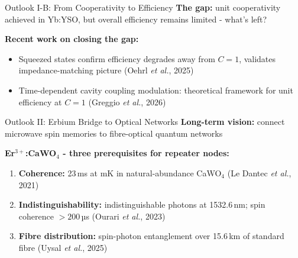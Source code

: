 \documentclass[10pt]{beamer}
\begin{document}
\begin{frame}{Outlook I-B: From Cooperativity to Efficiency}
    \textbf{The gap:} unit cooperativity achieved in Yb:YSO, but overall efficiency remains limited - what's left?

    \vspace{0.2cm}
    \textbf{Recent work on closing the gap:}
    \begin{itemize}
        \item<2-> Squeezed states confirm efficiency degrades away from $C=1$, validates impedance-matching picture (Oehrl \textit{et al.}, 2025)
        \item<3-> Time-dependent cavity coupling modulation: theoretical framework for unit efficiency at $C=1$ (Greggio \textit{et al.}, 2026)
    \end{itemize}

    \vspace{0.2cm}
\end{frame}

\begin{frame}{Outlook II: Erbium Bridge to Optical Networks}
    \textbf{Long-term vision:} connect microwave spin memories to fibre-optical quantum networks

    \vspace{0.15cm}
    \textbf{Er$^{3+}$:CaWO$_4$ - three prerequisites for repeater nodes:}
    \begin{enumerate}
        \item<2-> \textbf{Coherence:} 23\,ms at mK in natural-abundance CaWO$_4$ (Le Dantec \textit{et al.}, 2021)
        \item<3-> \textbf{Indistinguishability:} indistinguishable photons at 1532.6\,nm; spin coherence $>200$\,µs (Ourari \textit{et al.}, 2023)
        \item<4-> \textbf{Fibre distribution:} spin-photon entanglement over 15.6\,km of standard fibre (Uysal \textit{et al.}, 2025)
    \end{enumerate}

    \vspace{0.1cm}
\end{frame}
\end{document}
